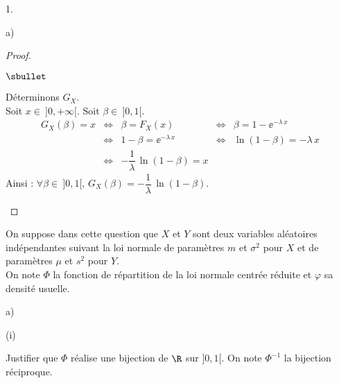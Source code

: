 \documentclass[11pt]{article}%
\begin{document}
\begin{noliste}{1.}
\begin{noliste}{a)}
\begin{proof}
      \begin{noliste}{$\sbullet$}
	\item Déterminons $G_X$.\\
	Soit $x \in \ ]0,+\infty[$. Soit $\beta \in \ ]0,1[$.
	\[
	  \begin{array}{rcccl}
	    G_X(\beta) = x & \Leftrightarrow & 
	    \beta = F_X(x) & \Leftrightarrow &
	    \beta = 1-\ee^{-\lambda \, x}
	    \\[.2cm]
	    & \Leftrightarrow & 1-\beta = \ee^{-\lambda \, x}
	    & \Leftrightarrow & \ln(1-\beta) = - \lambda \, x
	    \\[.2cm]
	    & \Leftrightarrow & -\dfrac{1}{\lambda} \, 
	    \ln(1-\beta) = x
	  \end{array}
	\]
	Ainsi : $\forall \beta \in \ ]0,1[$, $G_X(\beta) = 
	-\dfrac{1}{\lambda} \, \ln(1-\beta)$.
	~\\[-1.4cm]
      \end{noliste}
    \end{proof}

  \end{noliste}

  \item On suppose dans cette question que $X$ et $Y$ sont deux 
  variables aléatoires indépendantes suivant la loi normale de 
  paramètres $m$ et $\sigma^2$ pour $X$ et de paramètres $\mu$ et 
  $s^2$ pour $Y$.\\
  On note $\Phi$ la fonction de répartition de la loi normale 
  centrée réduite et $\varphi$ sa densité usuelle.
  \begin{noliste}{a)}
    \setlength{\itemsep}{2mm}
    \item 
    \begin{nonoliste}{(i)}
      \item Justifier que $\Phi$ réalise une bijection de $\R$ sur 
      $]0,1[$. On note $\Phi^{-1}$ la bijection réciproque.
      

\end{nonoliste}
\end{noliste}
\end{noliste}
\end{document}
